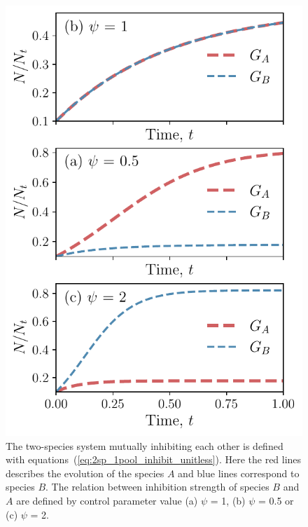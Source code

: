 \documentclass[10pt,A4paper]{article}
\numberwithin{equation}{section}
\begin{document}
\begin{figure}
    \begin{center}
    \includegraphics[width=\columnwidth]{Figures/pool_model_1pool_inhib.pdf}
    \caption{
        The two-species system mutually inhibiting each other is defined with equations~(\ref{eq:2sp_1pool_inhibit_unitless}).
        Here the red lines describes the evolution of the species $A$ and blue lines correspond to species $B$.
        The relation between inhibition strength of species $B$ and $A$ are defined by control parameter value (a) $\psi$ = 1, (b) $\psi$ = 0.5 or (c) $\psi$ = 2.
    }
    \label{fig:1pool_2sp_inhibit}
    \end{center}
\end{figure}
%
%
%
\end{document}
